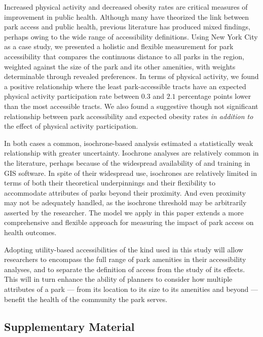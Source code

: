 \documentclass[shortAfour,sageh.bst]{sagej}
\begin{document}
Increased physical activity and decreased obesity rates are critical
measures of improvement in public health. Although many have theorized
the link between park access and public health, previous literature has
produced mixed findings, perhaps owing to the wide range of
accessibility definitions. Using New York City as a case study, we
presented a holistic and flexible measurement for park accessibility
that compares the continuous distance to all parks in the region,
weighted against the size of the park and its other amenities, with
weights determinable through revealed preferences. In terms of physical
activity, we found a positive relationship where the least
park-accessible tracts have an expected physical activity participation
rate between $0.3$ and $2.1$ percentage points lower than the most
accessible tracts. We also found a suggestive though not significant
relationship between park accessibility and expected obesity rates
\emph{in addition to} the effect of physical activity participation.

In both cases a common, isochrone-based analysis estimated a
statistically weak relationship with greater uncertainty. Isochrone
analyses are relatively common in the literature, perhaps because of the
widespread availability of and training in GIS software. In spite of
their widespread use, isochrones are relatively limited in terms of both
their theoretical underpinnings and their flexibility to accommodate
attributes of parks beyond their proximity. And even proximity may not
be adequately handled, as the isochrone threshold may be arbitrarily
asserted by the researcher. The model we apply in this paper extends a
more comprehensive and flexible approach for measuring the impact of
park access on health outcomes.

Adopting utility-based accessibilities of the kind used in this study
will allow researchers to encompass the full range of park amenities in
their accessibility analyses, and to separate the definition of access
from the study of its effects. This will in turn enhance the ability of
planners to consider how multiple attributes of a park --- from its
location to its size to its amenities and beyond --- benefit the health
of the community the park serves.

\begin{acks}
\end{acks}





\hypertarget{appendix}{%
\subsection{Supplementary Material}\label{appendix}}
\setcounter{table}{0}
\renewcommand{\thetable}{S\arabic{table}}
\end{document}
